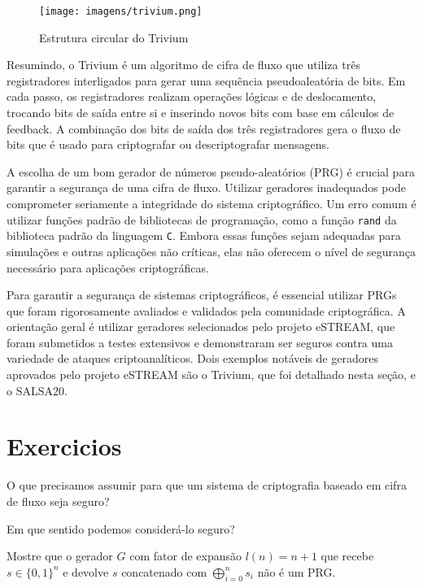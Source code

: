 \begin{figure}
  \centering
  \texttt{[image: imagens/trivium.png]}
  \caption{Estrutura circular do Trivium}
\end{figure}

Resumindo, o Trivium é um algoritmo de cifra de fluxo que utiliza três registradores interligados para gerar uma sequência pseudoaleatória de bits.
Em cada passo, os registradores realizam operações lógicas e de deslocamento, trocando bits de saída entre si e inserindo novos bits com base em cálculos de feedback.
A combinação dos bits de saída dos três registradores gera o fluxo de bits que é usado para criptografar ou descriptografar mensagens.

A escolha de um bom gerador de números pseudo-aleatórios (PRG) é crucial para garantir a segurança de uma cifra de fluxo.
Utilizar geradores inadequados pode comprometer seriamente a integridade do sistema criptográfico. Um erro comum é utilizar funções padrão de bibliotecas de programação, como a função \texttt{rand} da biblioteca padrão da linguagem \texttt{C}.
Embora essas funções sejam adequadas para simulações e outras aplicações não críticas, elas não oferecem o nível de segurança necessário para aplicações criptográficas.

Para garantir a segurança de sistemas criptográficos, é essencial utilizar PRGs que foram rigorosamente avaliados e validados pela comunidade criptográfica.
A orientação geral é utilizar geradores selecionados pelo projeto eSTREAM, que foram submetidos a testes extensivos e demonstraram ser seguros contra uma variedade de ataques criptoanalíticos.
Dois exemplos notáveis de geradores aprovados pelo projeto eSTREAM são o Trivium, que foi detalhado nesta seção, e o SALSA20.


\section{Exercicios}
\label{sec:exercicios}

\begin{exercicio}
  O que precisamos assumir para que um sistema de criptografia baseado em cifra de fluxo seja seguro?

  Em que sentido podemos considerá-lo seguro?
\end{exercicio}

\begin{exercicio}
Mostre que o gerador $G$ com fator de expansão $l(n) = n + 1$ que recebe $s \in \{0,1\}^n$ e devolve $s$ concatenado com $\bigoplus_{i=0}^ns_i$ não é um PRG.  
\end{exercicio}

